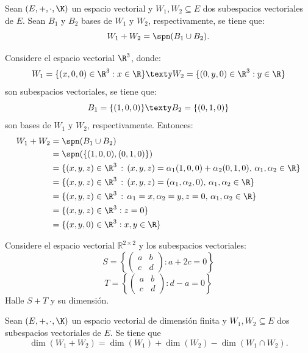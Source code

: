 \documentclass[compacto,10pt]{pubciencias-notas}
\begin{document}
\begin{prop}
    Sean $(E,+,\cdot,\K)$ un espacio vectorial y $W_1,W_2\subseteq E$ dos subespacios vectoriales de $E$. Sean $B_1$ y $B_2$ bases de $W_1$ y $W_2$, respectivamente, se tiene que:
    \[
        W_1 + W_2 = \spn(B_1 \cup B_2).
    \]
\end{prop}

\begin{ejem}\hspace{0pt} Considere el espacio vectorial $\R^{3}$, donde:
\[
    W_{1} = \{(x,0,0)\in \R^3: x \in \R \} 
    \texty
    W_{2} = \{(0,y,0)\in \R^3: y \in \R\}
\]
son subespacios vectoriales, se tiene que: 
\[
    B_{1} = \{(1, 0, 0)\}
    \texty
    B_{2} = \{(0, 1, 0)\}
\]
son bases de $W_{1}$ y $W_{2}$, respectivamente. Entonces:
\begin{align*}
    W_1+W_2
    &=\spn(B_{1} \cup B_{2})\\
    &= \spn(\{(1,0,0), (0,1,0)\})\\
    &= \{(x,y,z)\in\R^{3}\,:\, (x,y,z) = \alpha_{1}(1,0,0) + \alpha_{2}(0,1,0),\, \alpha_{1},\alpha_{2}\in\R \}\\
    &= \{(x,y,z)\in\R^{3}\,:\, (x,y,z) = (\alpha_{1},\alpha_{2},0),\, \alpha_{1},\alpha_{2}\in\R \}\\
    &= \{(x,y,z)\in\R^{3}\,:\, \alpha_{1} = x, \alpha_{2} = y, z=0,\, \alpha_{1},\alpha_{2}\in\R \}\\
    &= \{(x,y,z)\in \R^3:  z = 0\}\\
    &= \{(x,y,0)\in \R^3:  x,y\in \R \}
\end{align*}
\end{ejem}

\begin{ejer}\hspace{0pt} Considere el espacio vectorial $\mathbb{R}^{2\times 2}$ y los subespacios vectoriales:
\[S=\left\{\begin{pmatrix} a & b\\ c & d \end{pmatrix} : a+2c=0\right\}\]
\[T=\left\{\begin{pmatrix} a & b\\ c & d \end{pmatrix} : d-a=0\right\}\]
Halle $S+T$ y su dimensión.
\end{ejer}

\begin{teo}
    Sean $(E,+,\cdot,\K)$ un espacio vectorial de dimensión finita y $W_1,W_2\subseteq E$ dos subespacios vectoriales de $E$. Se tiene que
    \[
        \dim(W_1 + W_2) = \dim(W_1) + \dim(W_2) - \dim(W_1 \cap W_2).
    \]
\end{teo}
\end{document}
